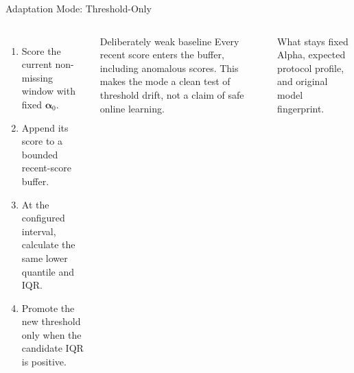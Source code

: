 \documentclass[aspectratio=169,10pt]{beamer}
\begin{document}
\begin{frame}{Adaptation Mode: Threshold-Only}
\begin{columns}[T,onlytextwidth]
\begin{enumerate}
  \item Score the current non-missing window with fixed
  $\boldsymbol{\alpha}_0$.
  \item Append its score to a bounded recent-score buffer.
  \item At the configured interval, calculate the same lower quantile and IQR.
  \item Promote the new threshold only when the candidate IQR is positive.
\end{enumerate}

\begin{alertblock}{Deliberately weak baseline}
Every recent score enters the buffer, including anomalous scores. This makes the
mode a clean test of threshold drift, not a claim of safe online learning.
\end{alertblock}

\begin{exampleblock}{What stays fixed}
Alpha, expected protocol profile, and original model fingerprint.
\end{exampleblock}
\end{columns}
\end{frame}
\end{document}
